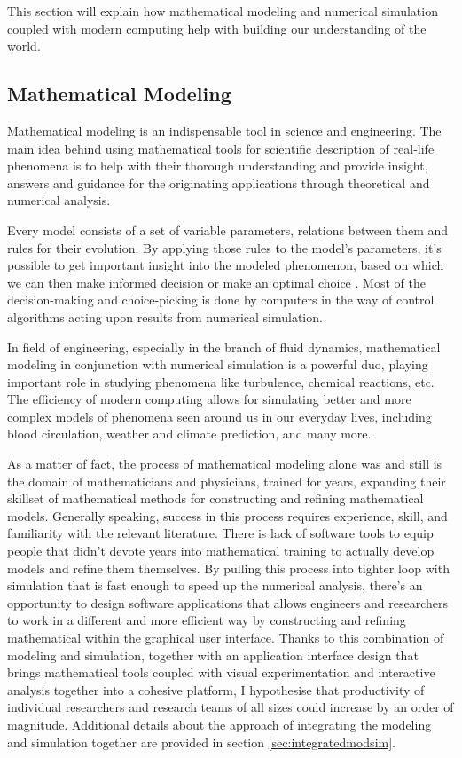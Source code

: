 This section will explain how mathematical modeling and numerical simulation coupled with modern computing help with building our understanding of the world.

\subsection{Mathematical Modeling}
Mathematical modeling is an indispensable tool in science and engineering. The main idea behind using mathematical tools for scientific description of real-life phenomena is to help with their thorough understanding and provide insight, answers and guidance for the originating applications through theoretical and numerical analysis.

Every model consists of a set of variable parameters, relations between them and rules for their evolution. By applying those rules to the model's parameters, it's possible to get important insight into the modeled phenomenon, based on which we can then make informed decision or make an optimal choice \citep{Neumaier2004}. Most of the decision-making and choice-picking is done by computers in the way of control algorithms acting upon results from numerical simulation. 

In field of engineering, especially in the branch of fluid dynamics, mathematical modeling in conjunction with numerical simulation is a powerful duo, playing important role in studying phenomena like turbulence, chemical reactions, etc. The efficiency of modern computing allows for simulating better and more complex models of phenomena seen around us in our everyday lives, including blood circulation, weather and climate prediction, and many more.

As a matter of fact, the process of mathematical modeling alone was and still is the domain of mathematicians and physicians, trained for years, expanding their skillset of mathematical methods for constructing and refining mathematical models. Generally speaking, success in this process requires experience, skill, and familiarity with the relevant literature. There is lack of software tools to equip people that didn't devote years into mathematical training to actually develop models and refine them themselves. By pulling this process into tighter loop with simulation that is fast enough to speed up the numerical analysis, there's an opportunity to design software applications that allows engineers and researchers to work in a different and more efficient way by constructing and refining mathematical within the graphical user interface. Thanks to this combination of modeling and simulation, together with an application interface design that brings mathematical tools coupled with visual experimentation and interactive analysis together into a cohesive platform, I hypothesise that productivity of individual researchers and research teams of all sizes could increase by an order of magnitude. Additional details about the approach of integrating the modeling and simulation together are provided in section \ref{sec:integratedmodsim}.


